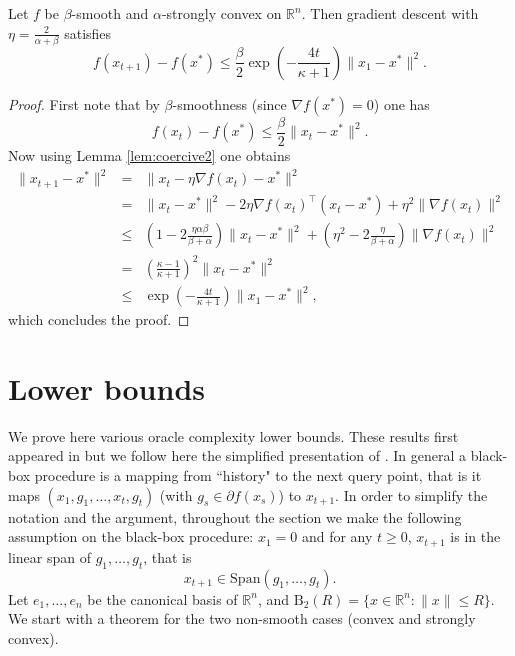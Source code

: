 \documentclass[openany]{now}
\newcommand{\mB}{\mathrm{B}}
\newcommand{\R}{\mathbb{R}}
\begin{document}
\begin{theorem}
Let $f$ be $\beta$-smooth and $\alpha$-strongly convex on $\R^n$. Then gradient descent with $\eta = \frac{2}{\alpha + \beta}$ satisfies
$$f(x_{t+1}) - f(x^*) \leq \frac{\beta}{2} \exp\left( - \frac{4 t}{\kappa+1} \right) \|x_1 - x^*\|^2 .$$
\end{theorem}

\begin{proof}
First note that by $\beta$-smoothness (since $\nabla f(x^*) = 0$) one has
$$f(x_t) - f(x^*) \leq \frac{\beta}{2} \|x_t - x^*\|^2 .$$
Now using Lemma \ref{lem:coercive2} one obtains
\begin{eqnarray*}
\|x_{t+1} - x^*\|^2& = & \|x_{t} - \eta \nabla f(x_{t}) - x^*\|^2 \\
& = & \|x_{t} - x^*\|^2 - 2 \eta \nabla f(x_{t})^{\top} (x_{t} - x^*) + \eta^2 \|\nabla f(x_{t})\|^2 \\
& \leq & \left(1 - 2 \frac{\eta \alpha \beta}{\beta + \alpha}\right)\|x_{t} - x^*\|^2 + \left(\eta^2 - 2 \frac{\eta}{\beta + \alpha}\right) \|\nabla f(x_{t})\|^2 \\
& = & \left(\frac{\kappa - 1}{\kappa+1}\right)^2 \|x_{t} - x^*\|^2 \\
& \leq & \exp\left( - \frac{4 t}{\kappa+1} \right) \|x_1 - x^*\|^2 ,
\end{eqnarray*}
which concludes the proof.
\end{proof}

\section{Lower bounds} \label{sec:chap3LB}
We prove here various oracle complexity lower bounds. These results first appeared in \cite{NY83} but we follow here the simplified presentation of \cite{Nes04}. In general a black-box procedure is a mapping from ``history" to the next query point, that is it maps $(x_1, g_1, \hdots, x_t, g_t)$ (with $g_s \in \partial f (x_s)$) to $x_{t+1}$. In order to simplify the notation and the argument, throughout the section we make the following assumption on the black-box procedure: $x_1=0$ and for any $t \geq 0$, $x_{t+1}$ is in the linear span of $g_1, \hdots, g_t$, that is
\begin{equation} \label{eq:ass1}
x_{t+1} \in \mathrm{Span}(g_1, \hdots, g_t) .
\end{equation}
Let $e_1, \hdots, e_n$ be the canonical basis of $\mathbb{R}^n$, and $\mB_2(R) = \{x \in \R^n : \|x\| \leq R\}$. We start with a theorem for the two non-smooth cases (convex and strongly convex).
\end{document}
